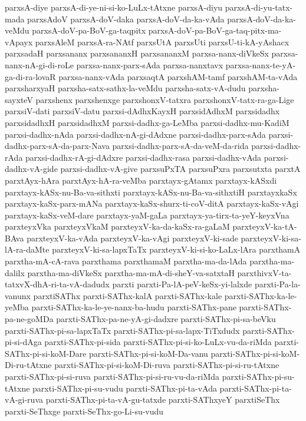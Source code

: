 {parxsA-diye
parxsA-di-ye-ni-si-ko-LuLx-tAtxne
parxsA-diyu
parxsA-di-yu-tatx-mada
parxsAdoV
parxsA-doV-daka
parxsA-doV-da-ka-vAda
parxsA-doV-da-ka-veMdu
parxsA-doV-pa-BoV-ga-taqpitx
parxsA-doV-pa-BoV-ga-taq-pitx-ma-vApayx
parxsAleM
parxsA-ra-NAtf
parxsUtA
parxsUti
parxsU-ti-kA-yAshacx
parxsadaH
parxsananx
parxsananxH
parxsananxM
parxsa-nanx-diVkeSx
parxsa-nanx-nA-gi-di-roLe
parxsa-nanx-parx-sAda
parxsa-nanxtavx
parxsa-nanx-te-yA-ga-di-ra-lovaR
parxsa-nanx-vAda
parxsaqtA
parxshAM-tamf
parxshAM-ta-vAda
parxsharxyaH
parxsha-satx-sathx-la-veMdu
parxsha-satx-vA-dudu
parxsha-sayxteV
parxshenx
parxshenxge
parxshonxV-tatxra
parxshonxV-tatx-ra-ga-Lige
parxsiV-dati
parxsiV-datu
parxsi-dAdhxKayxH
parxsidAdhxM
parxsidadhx
parxsidadhxH
parxsidadhxM
parxsi-dadhx-ga-LeMba
parxsi-dadhx-mu-KadiM
parxsi-dadhx-nAda
parxsi-dadhx-nA-gi-dAdxne
parxsi-dadhx-parx-sAda
parxsi-dadhx-parx-sA-da-parx-Nava
parxsi-dadhx-parx-sA-da-veM-da-rida
parxsi-dadhx-rAda
parxsi-dadhx-rA-gi-dAdxre
parxsi-dadhx-rasa
parxsi-dadhx-vAda
parxsi-dadhx-vA-gide
parxsi-dadhx-vA-give
parxsuPxTA
parxsuPxra
parxsutxta
parxtA
parxtAyx-hAra
parxtAyx-hA-ra-veMba
parxtayx-gAtamx
parxtayx-kASxdi
parxtayx-kASx-nu-Ba-va-sithxti
parxtayx-kASx-nu-Ba-va-sithxtiH
parxtayxkaSx
parxtayx-kaSx-parx-mANa
parxtayx-kaSx-shurx-ti-coV-ditA
parxtayx-kaSx-vAgi
parxtayx-kaSx-veM-dare
parxtayx-yaM-gaLa
parxtayx-ya-tirx-ta-yeY-keyxVna
parxteyxVka
parxteyxVkaM
parxteyxV-ka-da-kaSx-ra-gaLaM
parxteyxV-ka-tA-BAva
parxteyxV-ka-vAda
parxteyxV-ka-vAgi
parxteyxV-ki-sade
parxteyxV-ki-sa-lA-ra-daMte
parxteyxV-ki-sa-lapxTaTx
parxteyxV-ki-si-ko-LaLx-lAra
parxthamA
parxtha-mA-cA-rava
parxthama
parxthamaM
parxtha-ma-da-lAda
parxtha-ma-dalilx
parxtha-ma-diVkeSx
parxtha-ma-mA-di-sheY-va-satxtaH
parxthivxV-ta-tatxvX-dhA-ri-ta-vA-dadudx
parxti
parxti-Pa-lA-peV-keSx-yi-lalxde
parxti-Pa-la-vanunx
parxtiSAThx
parxti-SAThx-kalA
parxti-SAThx-kale
parxti-SAThx-ka-le-yeMba
parxti-SAThx-ka-le-ye-nanx-ba-hudu
parxti-SAThx-pane
parxti-SAThx-pa-ne-goMDa
parxti-SAThx-pa-ne-yA-gi-dadxre
parxti-SAThx-pi-sa-beVku
parxti-SAThx-pi-sa-lapxTaTx
parxti-SAThx-pi-sa-lapx-TiTxdudx
parxti-SAThx-pi-si-dAga
parxti-SAThx-pi-sida
parxti-SAThx-pi-si-ko-LuLx-vu-da-riMda
parxti-SAThx-pi-si-koM-Dare
parxti-SAThx-pi-si-koM-Da-vanu
parxti-SAThx-pi-si-koM-Di-ru-tAtxne
parxti-SAThx-pi-si-koM-Di-ruva
parxti-SAThx-pi-si-ru-tAtxne
parxti-SAThx-pi-si-ruva
parxti-SAThx-pi-si-ru-vu-da-riMda
parxti-SAThx-pi-su-tAtxne
parxti-SAThx-pi-su-vudu
parxti-SAThx-pi-ta-vAda
parxti-SAThx-pi-ta-vA-gi-ruva
parxti-SAThx-pi-ta-vA-gu-tatxde
parxti-SAThxyeY
parxtiSeThx
parxti-SeThxge
parxti-SeThx-go-Li-su-vudu
}
